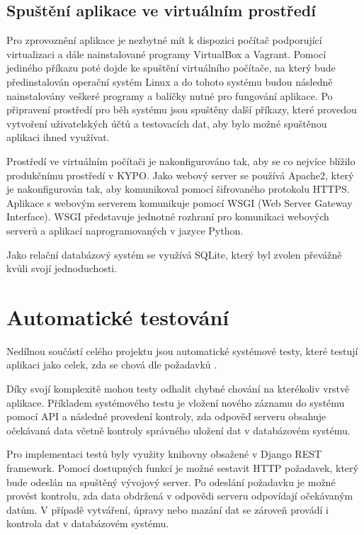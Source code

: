 \documentclass[
  digital,
  twoside,
  table, 
  nolof, 
  nolot
]{fithesis3}
\begin{document}
\subsection{Spuštění aplikace ve virtuálním prostředí}

Pro zprovoznění aplikace je nezbytné mít k dispozici počítač podporující virtualizaci a dále nainstalované programy VirtualBox \cite{virtualbox} a Vagrant. Pomocí jediného příkazu poté dojde ke spuštění virtuálního počítače, na který bude předinstalován operační systém Linux a do tohoto systému budou následně nainstalovány veškeré programy a balíčky nutné pro fungování aplikace. Po připravení prostředí pro běh systému jsou spuštěny další příkazy, které provedou vytvoření uživatelských účtů a testovacích dat, aby bylo možné spuštěnou aplikaci ihned využívat. 

Prostředí ve virtuálním počítači je nakonfigurováno tak, aby se co nejvíce blížilo produkčnímu prostředí v KYPO. Jako webový server se používá Apache2, který je nakonfigurován tak, aby komunikoval pomocí šifrovaného protokolu HTTPS. Aplikace s webovým serverem komunikuje pomocí WSGI (Web Server Gateway Interface). WSGI představuje jednotné rozhraní pro komunikaci webových serverů a aplikací naprogramovaných v jazyce Python.

Jako relační databázový systém se využívá SQLite, který byl zvolen převážně kvůli svojí jednoduchosti.

\section{Automatické testování}

Nedílnou součástí celého projektu jsou automatické systémové testy, které testují aplikaci jako celek, zda se chová dle požadavků \cite{difSysTest}.

Díky svojí komplexitě mohou testy odhalit chybné chování na kterékoliv vrstvě aplikace. Příkladem systémového testu je vložení nového záznamu do systému pomocí API a následné provedení kontroly, zda odpověď serveru obsahuje očekávaná data včetně kontroly správného uložení dat v databázovém systému.

Pro implementaci testů byly využity knihovny obsažené v Django REST framework. Pomocí dostupných funkcí je možné sestavit HTTP požadavek, který bude odeslán na spuštěný vývojový server. Po odeslání požadavku je možné provést kontrolu, zda data obdržená v odpovědi serveru odpovídají očekávaným datům. V případě vytváření, úpravy nebo mazání dat se zároveň provádí i kontrola dat v databázovém systému. 
\end{document}
